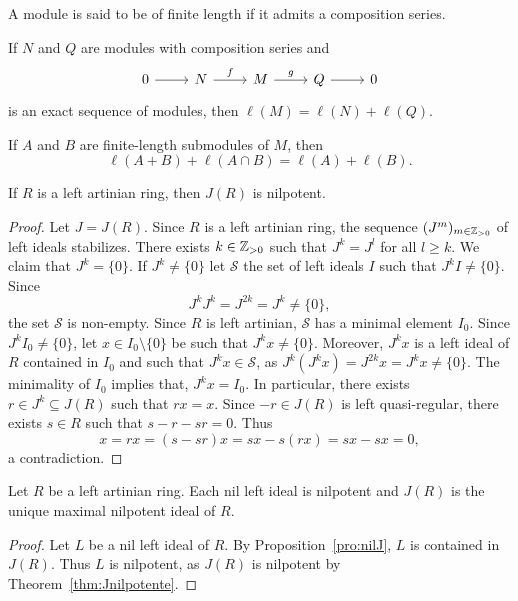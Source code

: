 A module is said to be of finite length if it admits a composition series. 

\begin{exercise}
	If $N$ and $Q$ are modules with composition series and  
	\[
	\begin{tikzcd}
		0 \arrow[r]
		& N \arrow{r}{f}
		& M \arrow{r}{g}
		& Q \arrow[r]
		& 0
	\end{tikzcd}
	\]
	is an exact sequence of modules, then $\ell(M)=\ell(N)+\ell(Q)$.
\end{exercise}


\begin{exercise}
	If $A$ and $B$ are finite-length submodules of $M$, then  
	\[
	\ell(A+B)+\ell(A\cap B)=\ell(A)+\ell(B).
	\]
\end{exercise}

\begin{theorem}
	\label{thm:Jnilpotente}
	If $R$ is a left artinian ring, then $J(R)$ is nilpotent. 
\end{theorem}

\begin{proof}
	Let $J=J(R)$. Since $R$ is a left artinian ring, the sequence 
	$(J^m)_{m\in\mathbb{Z}_{>0}}$ of left ideals stabilizes. There exists 
	$k\in\mathbb{Z}_{>0}$ such that $J^k=J^l$ for all $l\geq k$. We claim that $J^k=\{0\}$. If
	$J^k\ne\{0\}$ let $\mathcal{S}$ the set of left ideals 
	$I$ such that $J^kI\ne\{0\}$. Since 
	\[
	J^kJ^k=J^{2k}=J^k\ne\{0\},
	\]
	the set $\mathcal{S}$ is non-empty. 
	Since $R$ is left artinian, $\mathcal{S}$ has a minimal element $I_0$. Since $J^kI_0\ne\{0\}$, let $x\in
	I_0\setminus\{0\}$ be such that $J^kx\ne\{0\}$. Moreover, $J^kx$ is a left ideal of $R$ 
	contained in $I_0$ and such that $J^kx\in\mathcal{S}$, as 
	$J^k(J^kx)=J^{2k}x=J^kx\ne\{0\}$. The minimality of $I_0$ implies that, $J^kx=I_0$. In particular, 
	there exists $r\in J^k\subseteq J(R)$ such that $rx=x$. Since $-r\in
	J(R)$ is left quasi-regular, there exists $s\in R$ such that $s-r-sr=0$.
	Thus 
	\[
		x=rx=(s-sr)x=sx-s(rx)=sx-sx=0,
	\]
	a contradiction.
\end{proof}

\begin{corollary}
	Let $R$ be a left artinian ring. Each nil left ideal is nilpotent and 
	$J(R)$ is the unique maximal nilpotent ideal of $R$. 
\end{corollary}

\begin{proof}
	Let $L$ be a nil left ideal of $R$. By Proposition~\ref{pro:nilJ}, $L$
	is contained in $J(R)$. Thus $L$ is nilpotent, as $J(R)$ 
	is nilpotent by Theorem~\ref{thm:Jnilpotente}. 
\end{proof}


